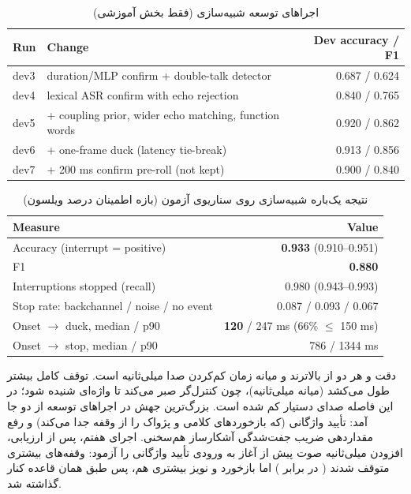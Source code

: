\begin{table}[ht]
\centering
\caption{اجراهای توسعه شبیه‌سازی (فقط بخش آموزشی)}
\label{tab:bargein-dev}
\small
\begin{latin}
\begin{tabular}{llr}
\toprule
Run & Change & Dev accuracy / F1 \\
\midrule
dev3 & duration/MLP confirm + double-talk detector & 0.687 / 0.624 \\
dev4 & lexical ASR confirm with echo rejection & 0.840 / 0.765 \\
dev5 & + coupling prior, wider echo matching, function words & 0.920 / 0.862 \\
dev6 & + one-frame duck (latency tie-break) & 0.913 / 0.856 \\
dev7 & + 200 ms confirm pre-roll (not kept) & 0.900 / 0.840 \\
\bottomrule
\end{tabular}
\end{latin}
\end{table}

\begin{table}[ht]
\centering
\caption{نتیجه یک‌باره شبیه‌سازی روی  سناریوی آزمون (بازه اطمینان  درصد ویلسون)}
\label{tab:bargein-sim}
\small
\begin{latin}
\begin{tabular}{lr}
\toprule
Measure & Value \\
\midrule
Accuracy (interrupt = positive) & \textbf{0.933} (0.910--0.951) \\
F1 & \textbf{0.880} \\
Interruptions stopped (recall) & 0.980 (0.943--0.993) \\
Stop rate: backchannel / noise / no event & 0.087 / 0.093 / 0.067 \\
Onset $\rightarrow$ duck, median / p90 & \textbf{120} / 247 ms (66\% $\le$ 150 ms) \\
Onset $\rightarrow$ stop, median / p90 & 786 / 1344 ms \\
\bottomrule
\end{tabular}
\end{latin}
\end{table}

دقت و  هر دو از  بالاترند و میانه زمان کم‌کردن صدا 
میلی‌ثانیه است. توقف کامل بیشتر طول می‌کشد (میانه  میلی‌ثانیه)، چون
کنترل‌گر صبر می‌کند تا واژه‌ای شنیده شود؛ در این فاصله صدای دستیار کم شده
است. بزرگ‌ترین جهش در اجراهای توسعه از دو جا آمد: تأیید واژگانی (که
بازخوردهای کلامی و پژواک را از وقفه جدا می‌کند) و رفع مقداردهی ضریب
جفت‌شدگی آشکارساز هم‌سخنی. اجرای هفتم، پس از ارزیابی، افزودن  میلی‌ثانیه صوت پیش از آغاز
به ورودی تأیید واژگانی را آزمود: وقفه‌های بیشتری متوقف شدند ( در برابر
) اما بازخورد و نویز بیشتری هم، پس طبق همان قاعده کنار گذاشته شد.

